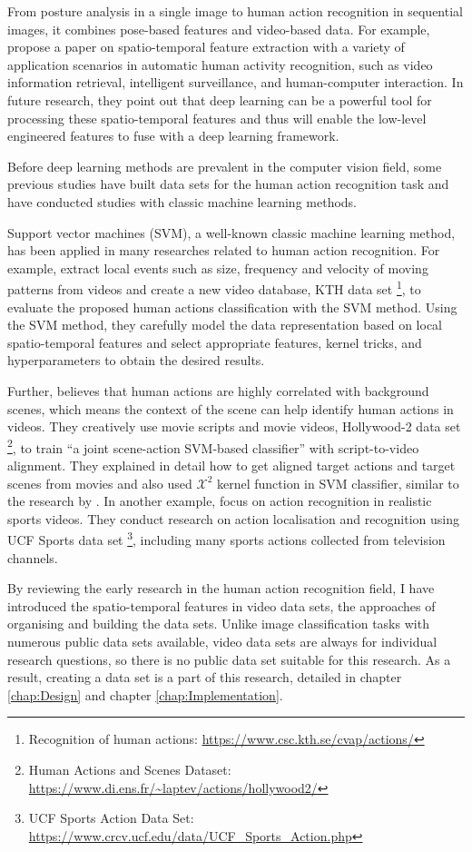 From posture analysis in a single image to human action recognition in sequential images, it combines pose-based features and video-based data.
For example, \citet{yao2016spatio} propose a paper on spatio-temporal feature extraction with a variety of application scenarios in automatic human activity recognition, such as video information retrieval, intelligent surveillance, and human-computer interaction.
In future research, they point out that deep learning can be a powerful tool for processing these spatio-temporal features and thus will enable the low-level engineered features to fuse with a deep learning framework.

Before deep learning methods are prevalent in the computer vision field, some previous studies have built data sets for the human action recognition task and have conducted studies with classic machine learning methods.

Support vector machines (SVM), a well-known classic machine learning method, has been applied in many researches related to human action recognition.
For example, \citet{schuldt2004recognizing} extract local events such as size, frequency and velocity of moving patterns from videos and create a new video database, KTH data set \footnote{Recognition of human actions: \url{https://www.csc.kth.se/cvap/actions/}}, to evaluate the proposed human actions classification with the SVM method.
Using the SVM method, they carefully model the data representation based on local spatio-temporal features and select appropriate features, kernel tricks, and hyperparameters to obtain the desired results.

Further, \citet{marszalek2009actions} believes that human actions are highly correlated with background scenes, which means the context of the scene can help identify human actions in videos.
They creatively use movie scripts and movie videos, Hollywood-2 data set \footnote{Human Actions and Scenes Dataset: \url{https://www.di.ens.fr/~laptev/actions/hollywood2/}}, to train ``a joint scene-action SVM-based classifier'' with script-to-video alignment.
They explained in detail how to get aligned target actions and target scenes from movies and also used $\mathcal{X}^2$ kernel function in SVM classifier, similar to the research by \citet{schuldt2004recognizing}. In another example, \citet{Soomro2014} focus on action recognition in realistic sports videos.
They conduct research on action localisation and recognition using UCF Sports data set \footnote{UCF Sports Action Data Set: \url{https://www.crcv.ucf.edu/data/UCF_Sports_Action.php}}, including many sports actions collected from television channels.

By reviewing the early research in the human action recognition field, I have introduced the spatio-temporal features in video data sets, the approaches of organising and building the data sets.
Unlike image classification tasks with numerous public data sets available, video data sets are always for individual research questions, so there is no public data set suitable for this research.
As a result, creating a data set is a part of this research, detailed in chapter \ref{chap:Design} and chapter \ref{chap:Implementation}.
